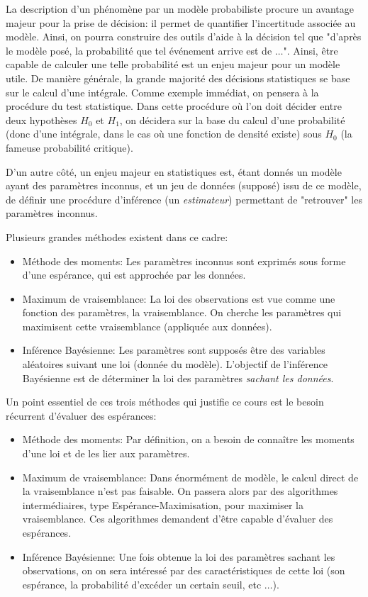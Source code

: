 La description d'un phénomène par un modèle probabiliste procure un avantage majeur pour la prise de décision: il permet de quantifier l'incertitude associée au modèle. 
Ainsi, on pourra construire des outils d'aide à la décision tel que "d'après le modèle posé, la probabilité que tel événement arrive est de $\dots$". Ainsi, être capable de calculer une telle probabilité est un enjeu majeur pour un modèle utile.
De manière générale, la grande majorité des décisions statistiques se base sur le calcul d'une intégrale. 
Comme exemple immédiat, on pensera à la procédure du test statistique. Dans cette procédure où l'on doit décider entre deux hypothèses $H_0$ et $H_1$, on décidera sur la base du calcul d'une probabilité (donc d'une intégrale, dans le cas où une fonction de densité existe) sous $H_0$ (la fameuse probabilité critique). 

D'un autre côté, un enjeu majeur en statistiques est, étant donnés un modèle ayant des paramètres inconnus, et un jeu de données (supposé) issu de ce modèle, de définir une procédure d'inférence (un \textit{estimateur}) permettant de "retrouver" les paramètres inconnus.

Plusieurs grandes méthodes existent dans ce cadre:
\begin{itemize}
\item Méthode des moments: Les paramètres inconnus sont exprimés sous forme d'une espérance, qui est approchée par les données.
\item Maximum de vraisemblance: La loi des observations est vue comme une fonction des paramètres, la vraisemblance. On cherche les paramètres qui maximisent cette vraisemblance (appliquée aux données).
\item Inférence Bayésienne: Les paramètres sont supposés être des variables aléatoires suivant une loi (donnée du modèle). L'objectif de l'inférence Bayésienne est de déterminer la loi des paramètres \textit{sachant les données}. 
\end{itemize}

Un point essentiel de ces trois méthodes qui justifie ce cours est le besoin récurrent d'évaluer des espérances:
\begin{itemize}
\item Méthode des moments: Par définition, on a besoin de connaître les moments d'une loi et de les lier aux paramètres.
\item Maximum de vraisemblance: Dans énormément de modèle, le calcul direct de la vraisemblance n'est pas faisable. On passera alors par des algorithmes intermédiaires, type Espérance-Maximisation, pour maximiser la vraisemblance. Ces algorithmes demandent d'être capable d'évaluer des espérances.
\item Inférence Bayésienne: Une fois obtenue la loi des paramètres sachant les observations, on on sera intéressé par des caractéristiques de cette loi (son espérance, la probabilité d'excéder un certain seuil, etc $\dots$).
\end{itemize}

